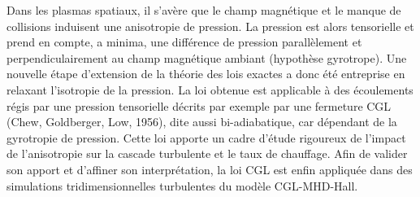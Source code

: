 	Dans les plasmas spatiaux, il s’avère que le champ magnétique et le manque de collisions induisent une anisotropie de pression. La pression est alors tensorielle et prend en compte, a minima, une différence de pression parallèlement et perpendiculairement au champ magnétique ambiant (hypothèse gyrotrope).  Une nouvelle étape d’extension de la théorie des lois exactes a donc été entreprise en relaxant l’isotropie de la pression. La loi obtenue est applicable à des écoulements régis par une pression tensorielle décrits par exemple par une fermeture CGL (Chew, Goldberger, Low, 1956), dite aussi bi-adiabatique, car dépendant de la gyrotropie de pression. Cette loi apporte un cadre d’étude rigoureux de l’impact de l’anisotropie sur la cascade turbulente et le taux de chauffage. Afin de valider son apport et d’affiner son interprétation, la loi CGL est enfin appliquée dans des simulations tridimensionnelles turbulentes du modèle CGL-MHD-Hall.
